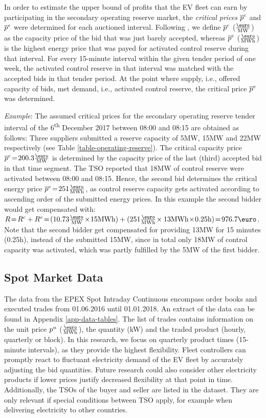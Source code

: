 \documentclass[a4paper, 12pt]{article}
\let\textcite\shortciteA
\begin{document}
In order to estimate the upper bound of profits that the EV fleet can earn by
participating in the secondary operating reserve market, the \emph{critical prices}
\(\overline p^c_{}\) and \(\overline p^e_{}\) were determined for each auctioned interval. Following
\textcite{brandt17_evaluat_busin_model_vehic_grid_integ}, we define \(\overline p^c_{}\)
(\(\emw\)) as the capacity price of the bid that was just barely
accepted, whereas \(\overline p^e_{}\) (\(\emwh\)) is the highest energy price
that was payed for activated control reserve during that interval. For every
15-minute interval within the given tender period of one week, the activated
control reserve in that interval was matched with the accepted bids in that
tender period. At the point where supply, i.e., offered capacity of bids, met
demand, i.e., activated control reserve, the critical price \(\overline p^e_{}\) was
determined.

\emph{Example}: The assumed critical prices for the secondary operating reserve
tender interval of the 6\textsuperscript{th} December 2017 between 08:00 and 08:15 are obtained
as follows: Three suppliers submitted a reserve capacity of 5MW, 15MW and 22MW
respectively (see Table \ref{table-operating-reserve}). The critical capacity
price \(\ccp{}\!=\!200.3\emw\) is determined by the capacity price of the last
(third) accepted bid in that time segment. The TSO reported that 18MW of control
reserve were activated between 08:00 and 08:15. Hence, the second bid determines
the critical energy price \(\cep{}\!=\!251\emwh\), as control reserve capacity
gets activated according to ascending order of the submitted energy prices. In
this example the second bidder would get compensated with:
\(R\!=\!R^c + R^e\!=\!(10.73\emw\!\times\!15\mw) +
(251\emwh\!\times13\mw\!\times\!0.25\text{h})\!=\! 976.7\eur\). Note that
the second bidder get compensated for providing 13MW for 15 minutes (0.25h),
instead of the submitted 15MW, since in total only 18MW of control capacity was
activated, which was partly fulfilled by the 5MW of the first bidder.

\subsection{Spot Market Data \label{sec-data-intraday}}
\label{sec:org6fc6086}
The data from the EPEX Spot Intraday Continuous encompass order books and
executed trades from 01.06.2016 until 01.01.2018. An extract of the data can be
found in Appendix \ref{app-data-tables}. The list of trades contains information
on the unit price \(p^u_{}\) (\(\emwh\)), the quantity (kW) and the traded product
(hourly, quarterly or block). In this research, we focus on quarterly product
times (15-minute intervals), as they provide the highest flexibility. Fleet
controllers can promptly react to fluctuant electricity demand of the EV fleet
by accurately adjusting the bid quantities. Future research could also consider
other electricity products if lower prices justify decreased flexibility at that
point in time. Additionally, the TSOs of the buyer and seller are listed in the
dataset. They are only relevant if special conditions between TSO apply, for
example when delivering electricity to other countries.
\end{document}
